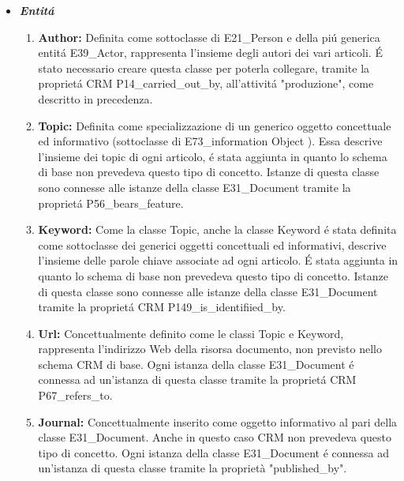 \documentclass[11pt,a4paper]{article}
\begin{document}
\begin{itemize}
	
	
	\item \textbf{\textit{Entit\'a}}
		\begin{enumerate}
			
			\item \textbf{Author:} Definita come sottoclasse di E21\_Person e della pi\'u generica entit\'a E39\_Actor, rappresenta l'insieme degli autori dei vari articoli. \'E stato necessario creare questa classe per poterla collegare, tramite la propriet\'a CRM P14\_carried\_out\_by, all'attivit\'a "produzione", come descritto in precedenza.
			
			\item \textbf{Topic:} Definita come specializzazione di un generico oggetto concettuale ed informativo (sottoclasse di E73\_information Object ). Essa descrive l'insieme dei topic di ogni articolo, \'e stata aggiunta in quanto lo schema di base non prevedeva questo tipo di concetto. Istanze di questa classe sono connesse alle istanze della classe E31\_Document tramite la propriet\'a P56\_bears\_feature. 
			
			\item \textbf{Keyword:} Come la classe Topic, anche la classe Keyword \'e stata definita come sottoclasse dei generici oggetti concettuali ed informativi, descrive l'insieme delle parole chiave associate ad ogni articolo. \'E stata aggiunta in quanto lo schema di base non prevedeva questo tipo di concetto. Istanze di questa classe sono connesse alle istanze della classe E31\_Document tramite la propriet\'a CRM P149\_is\_identifiied\_by.
			
			\item \textbf{Url:} Concettualmente definito come le classi Topic e Keyword, rappresenta l'indirizzo Web della risorsa documento, non previsto nello schema CRM di base. Ogni istanza della classe E31\_Document \'e connessa ad un'istanza di questa classe tramite la propriet\'a CRM P67\_refers\_to.
			
			\item \textbf{Journal:} Concettualmente inserito come oggetto informativo al pari della classe E31\_Document. Anche in questo caso CRM non prevedeva questo tipo di concetto. Ogni istanza della classe E31\_Document \'e connessa ad un'istanza di questa classe tramite la proprietà "published\_by".
			
						
		\end{enumerate}
		

\end{itemize}
\end{document}
